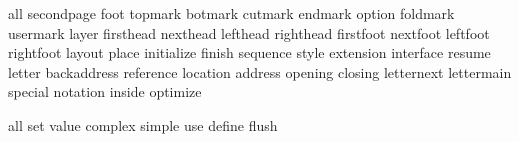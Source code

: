 \startinterface all
    {secondpage}
          {foot}
       {topmark}
       {botmark}
       {cutmark}
       {endmark}
        {option}
      {foldmark}
      {usermark}
         {layer}
     {firsthead}
      {nexthead}
      {lefthead}
     {righthead}
     {firstfoot}
      {nextfoot}
      {leftfoot}
     {rightfoot}
        {layout}
         {place}
    {initialize}
        {finish}
      {sequence}
         {style}
     {extension}
     {interface}
        {resume}
        {letter}
   {backaddress}
     {reference}
      {location}
       {address}
       {opening}
       {closing}
    {letternext}
    {lettermain}
       {special}
      {notation}
        {inside}
      {optimize}
\stopinterface

\startinterface all
         {set}
       {value}
     {complex}
      {simple}
         {use}
      {define}
       {flush}
\stopinterface

%


